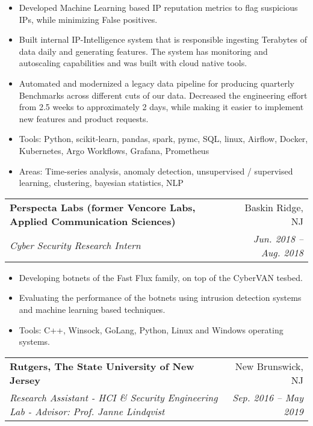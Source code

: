\documentclass[letterpaper,10pt]{article}
\makeatletter
\newcommand{\resumeSubheading}[4]{
  \vspace{-1pt}\item
    \begin{tabular*}{0.97\textwidth}{l@{\extracolsep{\fill}}r}
      \textbf{#1} & #2 \\
      \textit{\small#3} & \textit{\small #4} \\
    \end{tabular*}\vspace{-5pt}
}
\makeatother
\begin{document}
\begin{itemize}
  \item Developed Machine Learning based IP reputation metrics to flag suspicious IPs, while minimizing False positives. 
  \item Built internal IP-Intelligence system that is responsible ingesting Terabytes of data daily and generating features. The system 
  has monitoring and autoscaling capabilities and was built with cloud native tools.
  \item Automated and modernized a legacy data pipeline for producing quarterly Benchmarks across different cuts of our data. 
  Decreased the engineering effort from 2.5 weeks to approximately 2 days, while making it easier to implement new features and product requests.
  \item{Tools: } {Python, scikit-learn, pandas, spark, pymc, SQL, linux, Airflow, Docker, Kubernetes, Argo Workflows, Grafana, Prometheus}
  \item{Areas: } {Time-series analysis, anomaly detection, unsupervised / supervised learning, clustering, bayesian statistics, NLP}
\end{itemize}
\resumeSubheading
{Perspecta Labs (former Vencore Labs, Applied Communication Sciences)}{Baskin Ridge, NJ}
{Cyber Security Research Intern}{Jun. 2018 -- Aug. 2018}
\begin{itemize}
  \item Developing botnets of the Fast Flux family, on top of the CyberVAN tesbed.
  \item Evaluating the performance of the botnets using intrusion detection systems and machine learning based techniques.
  \item{Tools: }{C++, Winsock, GoLang, Python, Linux and Windows operating systems.}
\end{itemize}
\resumeSubheading
{Rutgers, The State University of New Jersey}{New Brunswick, NJ}
{Research Assistant - HCI \& Security Engineering Lab - Advisor: Prof. Janne Lindqvist}{Sep. 2016 -- May 2019}
\end{document}
